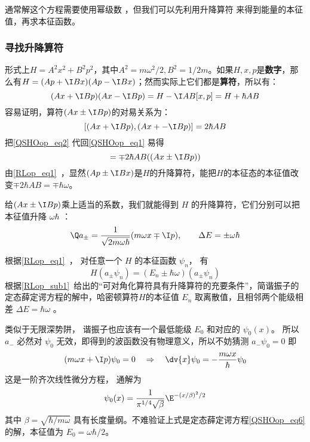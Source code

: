 通常解这个方程需要使用幂级数%
，但我们可以先利用升降算符 来得到能量的本征值，再求本征函数。


\subsubsection{寻找升降算符}

形式上$H=A^2x^2+B^2p^2$，其中$A^2=m\omega^2/2, B^2=1/2m$。如果$H, x, p$是\textbf{数字}，那么有$H = (Ap+\I Bx)(Ap-\I Bx)$；然而实际上它们都是\textbf{算符}，所以有：
\begin{equation}\label{QSHOop_eq1}
(Ax+\I Bp)(Ax-\I Bp) = H-\I AB[x, p] = H+\hbar AB
\end{equation}
容易证明，算符$(Ax\pm\I Bp)$的对易关系为：
\begin{equation}\label{QSHOop_eq2}
[(Ax+\I Bp), (Ax+-\I Bp)] = 2\hbar AB
\end{equation}
把\autoref{QSHOop_eq2} 代回\autoref{QSHOop_eq1} 易得
\begin{equation}
[H, (Ax\pm\I Bp) = [H+ \hbar AB, (Ax\pm\I Bp)] = \mp 2\hbar AB ((Ax\pm\I Bp))
\end{equation}
由\autoref{RLop_eq1}~，显然$(Ap\pm \I Bx)$是$H$的升降算符，能把$H$的本征态的本征值改变$\mp 2\hbar AB=\mp \hbar \omega$。

给$(Ax\pm\I Bp)$乘上适当的系数，我们就能得到 $H$ 的升降算符，它们分别可以把本征值升降 $\omega\hbar$ ：
\begin{equation}
\Q a_\pm = \frac{1}{\sqrt{2m\omega\hbar}} (m\omega x \mp \I p), 
\qquad
\Delta E = \pm \omega \hbar
\end{equation}

根据\autoref{RLop_eq1}~， 对任意一个 $H$ 的本征函数 $\psi_n$， 有
\begin{equation}
H(a_\pm\psi_n) = (E_n\pm\hbar\omega) (a_ \pm \psi_n)
\end{equation}
根据\autoref{RLop_sub1}~给出的“可对角化算符具有升降算符的充要条件”，简谐振子的定态薛定谔方程的解中，哈密顿算符$H$的本征值 $E_n$ 取离散值，且相邻两个能级相差 $\Delta E = \hbar \omega$ 。



类似于无限深势阱， 谐振子也应该有一个最低能级 $E_0$ 和对应的 $\psi_0(x)$。 所以 $a_-$ 必然对 $\psi_0$ 无效，即得到的波函数没有物理意义，所以不妨猜测 $a_- \psi_0 = 0$ 
即
\begin{equation}
(m\omega x + \I p)\psi_0 = 0
\quad \Rightarrow \quad
\dv{x} \psi_0 =  - \frac{m\omega x}{\hbar } \psi_0
\end{equation}
这是一阶齐次线性微分方程，%
通解为
\begin{equation}
\psi_0(x) = \frac{1}{\pi^{1/4}\sqrt\beta} \E^{-(x/\beta)^2/2}
\end{equation}
其中 $\beta = \sqrt{\hbar /m\omega}$ 具有长度量纲。不难验证上式是定态薛定谔方程\autoref{QSHOop_eq6} 的解，本征值为 $E_0=\omega\hbar/2$。



